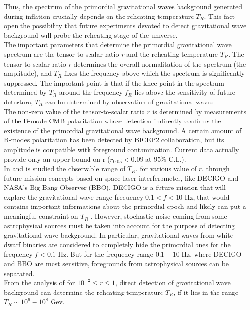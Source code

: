 \documentclass[11pt,a4paper,twoside]{book}
\begin{document}
Thus, the spectrum of the primordial gravitational waves background generated during inflation crucially depends on the reheating temperature $ T_{R} $.  This fact open the possibility that future experiments devoted to detect gravitational wave background will probe the reheating stage of the universe.\\
The important parameters that determine the primordial gravitational wave spectrum are the tensor-to-scalar ratio $ r $ and the reheating temperature $ T_{R} $. The tensor-to-scalar ratio $ r $ determines the overall normalitation of the spectrum (the amplitude), and $ T_{R} $ fixes the frequency above which the spectrum is significantly suppressed. The important point is that if the knee point in the spectrum  determined by $ T_{R} $ around the frequency $ f_{R} $ lies above the sensitivity of future detectors, $ T_{R} $ can be determined by observation of gravitational waves.\\
The non-zero value of the tensor-to-scalar ratio $ r $ is determined by measurements of the B-mode CMB polaritation  whose detection indirectly confirms the existence of the primordial gravitational wave background. A certain amount of B-modes polaritation has been detected  by BICEP2 collaboration, but its amplitude is compatible with foreground contamination. Current data actually provide only an upper bound on r ($ r_{0.05} < 0.09 $ at $ 95 \% $ C.L.).\\
In \cite{Chap3:ProibingReheatingTemperature2008} and \cite{Chap3:ProspectsForDeterminationWithDetectors} is studied the observable range of $ T_{R} $,  for various value of $ r $, through future mission concepts based on space laser interferometer, like DECIGO \cite{Chap3: DECIGO} and NASA's Big Bang Observer (BBO). DECIGO is a future mission that will explore the gravitational wave range frequency $ 0.1 < f < 10 $ Hz, that would contains important informations about the primordial epoch and likely can put a meaningful constraint on $ T_{R} $ . However, stochastic noise coming from some astrophysical sources must be taken into account for the purpose of detecting gravitational wave background. In particular, gravitational waves from white-dwarf binaries are considered to completely hide the primordial ones for the frequency $ f<0.1 $ Hz. But for the frequency range $ 0.1-10 $ Hz, where DECIGO and BBO are most sensitive, foregrounds from astrophysical sources can be separated. \\
From the analysis of \cite{Chap3:ProibingReheatingTemperature2008} for $ 10^{-3} \le r \le 1 $, direct detection of gravitational wave background can determine the reheating temperature $ T_{R} $, if it lies in the range $ T_{R} \sim 10^{6}-10^{8} $ Gev.\\
\end{document}
